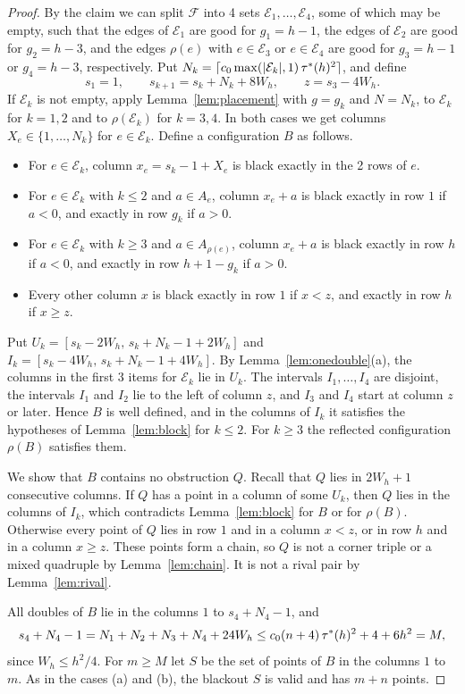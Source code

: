 \begin{proof}
By the claim we can split $\mathcal F$ into 4 sets $\mathcal E_1,\dots,\mathcal E_4$, some
of which may be empty, such that the edges of $\mathcal E_1$ are good for $g_1=h-1$, the
edges of $\mathcal E_2$ are good for $g_2=h-3$, and the edges $\rho(e)$ with
$e\in\mathcal E_3$ or $e\in\mathcal E_4$ are good for $g_3=h-1$ or $g_4=h-3$, respectively.
Put $N_k=\lceil c_0\max(|\mathcal E_k|,1)\,{\tau^*}(h)^2\rceil$, and define
\[
 s_1=1,\qquad s_{k+1}=s_k+N_k+8W_h,\qquad z=s_3-4W_h .
\]
If $\mathcal E_k$ is not empty, apply Lemma~\ref{lem:placement} with $g=g_k$ and $N=N_k$,
to $\mathcal E_k$ for $k=1,2$ and to $\rho(\mathcal E_k)$ for $k=3,4$. In both cases we get
columns $X_e\in\{1,\dots,N_k\}$ for $e\in\mathcal E_k$. Define a configuration $B$ as
follows.
\begin{itemize}
\item For $e\in\mathcal E_k$, column $x_e=s_k-1+X_e$ is black exactly in the 2 rows of $e$.
\item For $e\in\mathcal E_k$ with $k\le2$ and $a\in A_e$, column $x_e+a$ is black exactly
in row $1$ if $a<0$, and exactly in row $g_k$ if $a>0$.
\item For $e\in\mathcal E_k$ with $k\ge3$ and $a\in A_{\rho(e)}$, column $x_e+a$ is black
exactly in row $h$ if $a<0$, and exactly in row $h+1-g_k$ if $a>0$.
\item Every other column $x$ is black exactly in row $1$ if $x<z$, and exactly in row $h$
if $x\ge z$.
\end{itemize}
Put $U_k=[s_k-2W_h,\,s_k+N_k-1+2W_h]$ and $I_k=[s_k-4W_h,\,s_k+N_k-1+4W_h]$. By
Lemma~\ref{lem:onedouble}(a), the columns in the first 3 items for $\mathcal E_k$ lie in
$U_k$. The intervals $I_1,\dots,I_4$ are disjoint, the intervals $I_1$ and $I_2$ lie to the
left of column $z$, and $I_3$ and $I_4$ start at column $z$ or later. Hence $B$ is well
defined, and in the columns of $I_k$ it satisfies the hypotheses of Lemma~\ref{lem:block}
for $k\le2$. For $k\ge3$ the reflected configuration $\rho(B)$ satisfies them.

We show that $B$ contains no obstruction $Q$. Recall that $Q$ lies in $2W_h+1$ consecutive
columns. If $Q$ has a point in a column of some $U_k$, then $Q$ lies in the columns of
$I_k$, which contradicts Lemma~\ref{lem:block} for $B$ or for $\rho(B)$. Otherwise every
point of $Q$ lies in row $1$ and in a column $x<z$, or in row $h$ and in a column $x\ge z$.
These points form a chain, so $Q$ is not a corner triple or a mixed quadruple by
Lemma~\ref{lem:chain}. It is not a rival pair by Lemma~\ref{lem:rival}.

All doubles of $B$ lie in the columns $1$ to $s_4+N_4-1$, and
\[
 s_4+N_4-1=N_1+N_2+N_3+N_4+24W_h\le c_0(n+4)\,{\tau^*}(h)^2+4+6h^2=M ,
\]
since $W_h\le h^2/4$. For $m\ge M$ let $S$ be the set of points of $B$ in the columns $1$
to $m$. As in the cases (a) and (b), the blackout $S$ is valid and has $m+n$ points.
\end{proof}

